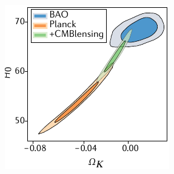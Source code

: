 \documentclass[aspectratio=169]{beamer}
\begin{document}
\begin{frame}
\begin{columns}
        \includegraphics[width=\textwidth]{figures/nature5}
    \end{columns}

\end{frame}
\end{document}
